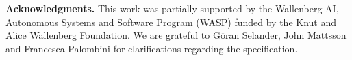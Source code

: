 \documentclass[runningheads, envcountsame, a4paper, draft, x11names]{llncs}
\newcommand{\runhead}[1]{\noindent\textbf{#1. }}
\begin{document}


\runhead{Acknowledgments} This work was partially supported by
the Wallenberg AI, Autonomous Systems and Software Program (WASP) funded by
the Knut and Alice Wallenberg Foundation.
%
We are grateful to G\"oran Selander, John Mattsson and Francesca Palombini for
clarifications regarding the specification.
%




\end{document}

